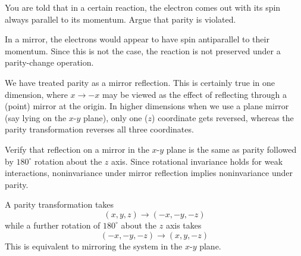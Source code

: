 \documentclass[../principles-of-quantum-mechanics.tex]{subfiles}
\begin{document}
\begin{questions}
		\question You are told that in a certain reaction, the electron comes out with its spin always parallel to its momentum. Argue that parity is violated.
		
		\begin{solution}
			In a mirror, the electrons would appear to have spin antiparallel to their momentum. Since this is not the case, the reaction is not preserved under a parity-change operation.
		\end{solution}
		
		\question We have treated parity as a mirror reflection. This is certainly true in one dimension, where $x\to{-x}$ may be viewed as the effect of reflecting through a (point) mirror at the origin. In higher dimensions when we use a plane mirror (say lying on the $x$-$y$ plane), only one ($z$) coordinate gets reversed, whereas the parity transformation reverses all three coordinates.
		
		Verify that reflection on a mirror in the $x$-$y$ plane is the same as parity followed by $180^\circ$ rotation about the $z$ axis. Since rotational invariance holds for weak interactions, noninvariance under mirror reflection implies noninvariance under parity.
		
		\begin{solution}
			A parity transformation takes
			$$(x, y, z) \to (-x, -y, -z)$$
			while a further rotation of $180^\circ$ about the $z$ axis takes
			$$(-x, -y, -z) \to (x, y, -z)$$
			This is equivalent to mirroring the system in the $x$-$y$ plane.
		\end{solution}
		
	\end{questions}
\end{document}
